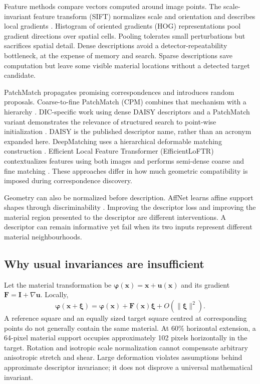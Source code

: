\documentclass[11pt,a4paper]{article}
\newcommand{\uu}{\mathbf u}\newcommand{\xx}{\mathbf x}\newcommand{\FF}{\mathbf F}
\begin{document}
Feature methods compare vectors computed around image points. The scale-invariant feature transform (SIFT) normalizes scale and orientation and describes local gradients \citep{lowe}. Histogram of oriented gradients (HOG) representations pool gradient directions over spatial cells. Pooling tolerates small perturbations but sacrifices spatial detail. Dense descriptions avoid a detector-repeatability bottleneck, at the expense of memory and search. Sparse descriptions save computation but leave some visible material locations without a detected target candidate.

PatchMatch propagates promising correspondences and introduces random proposals. Coarse-to-fine PatchMatch (CPM) combines that mechanism with a hierarchy \citep{hu}. DIC-specific work using dense DAISY descriptors \citep{daisy} and a PatchMatch variant demonstrates the relevance of structured search to point-wise initialization \citep{li}. DAISY is the published descriptor name, rather than an acronym expanded here. DeepMatching uses a hierarchical deformable matching construction \citep{deepmatching}. Efficient Local Feature Transformer (EfficientLoFTR) contextualizes features using both images and performs semi-dense coarse and fine matching \citep{eloftr}. These approaches differ in how much geometric compatibility is imposed during correspondence discovery.

Geometry can also be normalized before description. AffNet learns affine support shapes through discriminability \citep{affnet}. Improving the descriptor loss and improving the material region presented to the descriptor are different interventions. A descriptor can remain informative yet fail when its two inputs represent different material neighbourhoods.

\subsection{Why usual invariances are insufficient}
Let the material transformation be $\boldsymbol\varphi(\xx)=\xx+\uu(\xx)$ and its gradient $\FF=\mathbf I+\nabla\uu$. Locally,
\begin{equation}
\boldsymbol\varphi(\xx+\boldsymbol\xi)=\boldsymbol\varphi(\xx)+\FF(\xx)\boldsymbol\xi+O(\|\boldsymbol\xi\|^2).
\end{equation}
A reference square and an equally sized target square centred at corresponding points do not generally contain the same material. At 60\% horizontal extension, a 64-pixel material support occupies approximately 102 pixels horizontally in the target. Rotation and isotropic scale normalization cannot compensate arbitrary anisotropic stretch and shear. Large deformation violates assumptions behind approximate descriptor invariance; it does not disprove a universal mathematical invariant.
\end{document}
